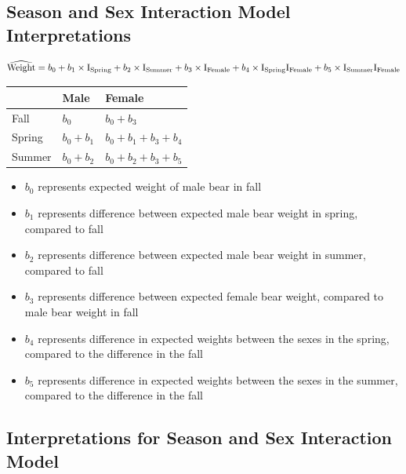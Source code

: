 \documentclass[]{book}
\providecommand{\tightlist}{%
  \setlength{\itemsep}{0pt}\setlength{\parskip}{0pt}}
\begin{document}
\subsection{Season and Sex Interaction Model
Interpretations}\label{season-and-sex-interaction-model-interpretations}

\[\widehat{\text{Weight}} = b_0 + b_1 \times\text{I}_{\text{Spring}} + b_2\times\text{I}_{\text{Summer}} +b_3\times\text{I}_{\text{Female}}\\ +b_4\times\text{I}_{\text{Spring}}\text{I}_{\text{Female}} +b_5\times\text{I}_{\text{Summer}}\text{I}_{\text{Female}}\]

\begin{longtable}[]{@{}lll@{}}
\toprule
& Male & Female\tabularnewline
\midrule
\endhead
Fall & \(b_0\) & \(b_0+b_3\)\tabularnewline
Spring & \(b_0+b_1\) & \(b_0+b_1 +b_3+b_4\)\tabularnewline
Summer & \(b_0+b_2\) & \(b_0+b_2+b_3+b_5\)\tabularnewline
\bottomrule
\end{longtable}

\begin{itemize}
\tightlist
\item
  \(b_0\) represents expected weight of male bear in fall\\
\item
  \(b_1\) represents difference between expected male bear weight in
  spring, compared to fall\\
\item
  \(b_2\) represents difference between expected male bear weight in
  summer, compared to fall\\
\item
  \(b_3\) represents difference between expected female bear weight,
  compared to male bear weight in fall\\
\item
  \(b_4\) represents difference in expected weights between the sexes in
  the spring, compared to the difference in the fall\\
\item
  \(b_5\) represents difference in expected weights between the sexes in
  the summer, compared to the difference in the fall
\end{itemize}

\subsection{Interpretations for Season and Sex Interaction
Model}\label{interpretations-for-season-and-sex-interaction-model}
\end{document}
